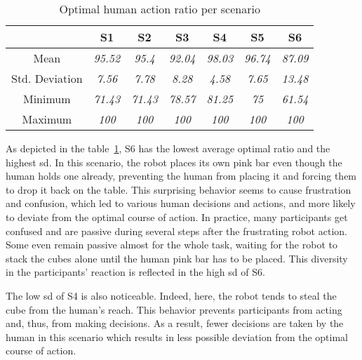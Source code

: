 \begin{table}[h]
    \center
    \begin{tabular}{c|c|c|c|c|c|c|}
    \cline{2-7}
    \textbf{}                            & S1             & S2             & S3             & S4             & S5            & S6             \\ \hline
    \multicolumn{1}{|c|}{Mean}           & \textit{95.52} & \textit{95.4} & \textit{92.04} & \textit{98.03} & \textit{96.74} & \textit{87.09} \\ \hline
    \multicolumn{1}{|c|}{Std. Deviation} & \textit{7.56}  & \textit{7.78}  & \textit{8.28}  & \textit{4.58}  & \textit{7.65} & \textit{13.48} \\ \hline
    \multicolumn{1}{|c|}{Minimum}        & \textit{71.43} & \textit{71.43} & \textit{78.57} & \textit{81.25} & \textit{75}   & \textit{61.54} \\ \hline
    \multicolumn{1}{|c|}{Maximum}        & \textit{100}   & \textit{100}   & \textit{100}   & \textit{100}   & \textit{100}  & \textit{100}   \\ \hline
    \end{tabular}
    \caption{Optimal human action ratio per scenario}
    \label{tab:optimal_human_ratio}
    \end{table}



As depicted in the table~\ref{tab:optimal_human_ratio}, 
S6 has the lowest average optimal ratio and the highest \acrshort{sd}. In this scenario, the robot places its own pink bar even though the human holds one already, preventing the human from placing it and forcing them to drop it back on the table. This surprising behavior seems to cause frustration and confusion, which led to various human decisions and actions, and more likely to deviate from the optimal course of action. In practice, many participants get confused and are passive during several steps after the frustrating robot action. Some even remain passive almost for the whole task, waiting for the robot to stack the cubes alone until the human pink bar has to be placed. This diversity in the participants' reaction is reflected in the high \acrshort{sd} of S6.

The low \acrshort{sd} of S4 is also noticeable. Indeed, here, the robot tends to steal the cube from the human's reach. This behavior prevents participants from acting and, thus, from making decisions. As a result, fewer decisions are taken by the human in this scenario which results in less possible deviation from the optimal course of action.

